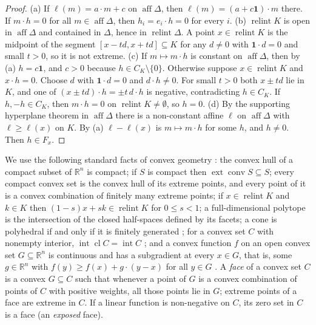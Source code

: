 \documentclass[11pt]{article}
\newcommand{\R}{\mathbb{R}}
\newcommand{\one}{\mathbf{1}}
\DeclareMathOperator{\conv}{conv}
\DeclareMathOperator{\relint}{relint}
\DeclareMathOperator{\aff}{aff}
\DeclareMathOperator{\ext}{ext}
\DeclareMathOperator{\cl}{cl}
\DeclareMathOperator{\inter}{int}
\theoremstyle{plain}
\theoremstyle{definition}
\theoremstyle{remark}
\begin{document}
\begin{proof}
(a) If $\ell(m)=a\cdot m+c$ on $\aff\Delta$, then $\ell(m)=(a+c\one)\cdot m$ there. If
$m\cdot h=0$ for all $m\in\aff\Delta$, then $h_i=e_i\cdot h=0$ for every $i$.
(b) $\relint K$ is open in $\aff\Delta$ and contained in $\Delta$, hence in $\relint\Delta$.
A point $x\in\relint K$ is the midpoint of the segment $[x-td,x+td]\subseteq K$ for any
$d\neq0$ with $\one\cdot d=0$ and small $t>0$, so it is not extreme.
(c) If $m\mapsto m\cdot h$ is constant on $\aff\Delta$, then by (a) $h=c\one$, and $c>0$
because $h\in C_K\setminus\{0\}$. Otherwise suppose $x\in\relint K$ and $x\cdot h=0$.
Choose $d$ with $\one\cdot d=0$ and $d\cdot h\neq0$. For small $t>0$ both $x\pm td$ lie in
$K$, and one of $(x\pm td)\cdot h=\pm t\,d\cdot h$ is negative, contradicting $h\in C_K$.
If $h,-h\in C_K$, then $m\cdot h=0$ on $\relint K\ne\emptyset$, so $h=0$.
(d) By the supporting hyperplane theorem in $\aff\Delta$ \cite[Thm.~11.6]{Rockafellar}
there is a non-constant affine $\ell$ on $\aff\Delta$ with $\ell\ge\ell(x)$ on $K$. By (a)
$\ell-\ell(x)$ is $m\mapsto m\cdot h$ for some $h$, and $h\neq0$. Then $h\in F_x$.
\end{proof}

We use the following standard facts of convex geometry \cite{Rockafellar,Schrijver}: the
convex hull of a compact subset of $\R^n$ is compact; if $S$ is compact then $\ext\conv
S\subseteq S$; every compact convex set is the convex hull of its extreme points, and every
point of it is a convex combination of finitely many extreme points; if $x\in\relint K$ and
$k\in K$ then $(1-s)x+sk\in\relint K$ for $0\le s<1$; a full-dimensional polytope is the
intersection of the closed half-spaces defined by its facets; a cone is polyhedral if
and only if it is finitely generated \cite[Cor.~7.1a]{Schrijver}; for a convex set $C$
with nonempty interior, $\inter\cl C=\inter C$ \cite[Thm.~6.3]{Rockafellar}; and a convex
function $f$ on an open convex set $G\subseteq\R^n$ is continuous and has a subgradient
at every $x\in G$, that is, some $g\in\R^n$ with $f(y)\ge f(x)+g\cdot(y-x)$ for all $y\in
G$ \cite{Rockafellar}. A \emph{face} of a convex
set $C$ is a convex $G\subseteq C$ such that whenever a point of $G$ is a convex
combination of points of $C$ with positive weights, all those points lie in $G$; extreme
points of a face are extreme in $C$. If a linear function is non-negative on $C$, its zero
set in $C$ is a face (an \emph{exposed} face).
\end{document}
